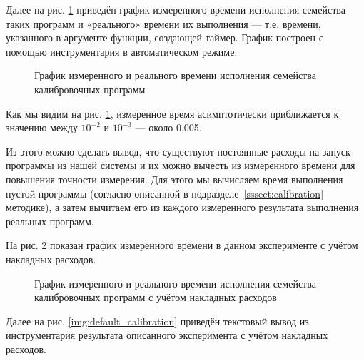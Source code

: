 Далее на рис. \ref{img:calibration} приведён график измеренного времени исполнения семейства таких программ и «реального» времени их выполнения --- т.е. времени, указанного в аргументе функции, создающей таймер. График построен с помощью инструментария в автоматическом режиме.

\begin{figure}[p]
    \caption{График измеренного и реального времени исполнения семейства калибровочных программ}
    \label{img:calibration}
\end{figure}

Как мы видим на рис. \ref{img:calibration}, измеренное время асимптотически приближается к значению между $10^{-2}$ и $10^{-3}$ --- около 0,005.

Из этого можно сделать вывод, что существуют постоянные расходы на запуск программы из нашей системы и их можно вычесть из измеренного времени для повышения точности измерения. Для этого мы вычисляем время выполнения пустой программы (согласно описанной в подразделе~\ref{sssect:calibration} методике), а затем вычитаем его из каждого измеренного результата выполнения реальных программ.

На рис. \ref{img:calibration-offset} показан график измеренного времени в данном эксперименте с учётом накладных расходов.

\begin{figure}[p]
    \caption{График измеренного и реального времени исполнения семейства калибровочных программ с учётом накладных расходов}
    \label{img:calibration-offset}
\end{figure}

Далее на рис. \ref{img:default_calibration} приведён текстовый вывод из инструментария результата описанного эксперимента с учётом накладных расходов.


